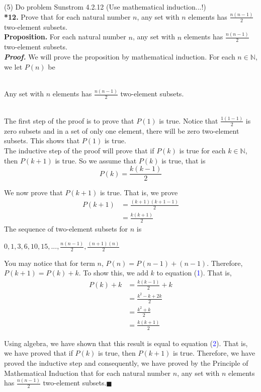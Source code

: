 \documentclass{article}
\begin{document}
(5) Do problem Sunstrom 4.2.12 (Use mathematical induction...!)\\

\textbf{*12.} Prove that for each natural number $n$, any set with $n$ elements has $\frac{n(n - 1)}{2}$ two-element subsets.\\

\textbf{Proposition.} For each natural number $n$, any set with $n$ elements has $\frac{n(n - 1)}{2}$ two-element subsets.\\
\textit{\textbf{Proof.}} We will prove the proposition by mathematical induction. For each $n \in \mathbb{N}$, we let $P(n)$ be \\ \\
\centerline{Any set with $n$ elements has $\frac{n(n - 1)}{2}$ two-element subsets.}\\

The first step of the proof is to prove that $P(1)$ is true. Notice that $\frac{1(1 - 1)}{2}$ is zero subsets and in a set of only one element, there will be zero two-element subsets. This shows that $P(1)$ is true.\\

The inductive step of the proof will prove that if $P(k)$ is true for each $k \in \mathbb{N}$, then $P(k + 1)$ is true. So we assume that $P(k)$ is true, that is \begin{equation}
P(k) = \frac{k(k - 1)}{2}
\end{equation}

We now prove that $P(k + 1)$ is true. That is, we prove
\begin{align}
P(k + 1) &= \frac{(k + 1)(k + 1 - 1)}{2}\nonumber \\
&= \frac{k(k + 1)}{2} 
\end{align}
The sequence of two-element subsets for $n$ is\\
\centerline{$0, 1, 3, 6, 10, 15, ... , \frac{n(n - 1)}{2}, \frac{(n + 1)(n)}{2}$}

You may notice that for term $n$, $P(n) = P(n - 1) + (n - 1)$. Therefore, $P(k + 1) = P(k) + k$. To show this, we add $k$ to equation (\textcolor{blue}{1}). That is,
\begin{align*}
P(k) + k &= \frac{k(k - 1)}{2} + k\\
&= \frac{k^2 - k + 2k}{2}\\
&= \frac{k^2 + k}{2}\\
&= \frac{k(k + 1)}{2}
\end{align*}

Using algebra, we have shown that this result is equal to equation (\textcolor{blue}{2}). That is, we have proved that if $P(k)$ is true, then $P(k + 1)$ is true. Therefore, we have proved the inductive step and consequently, we have proved by the Principle of Mathematical Induction that for each natural number $n$, any set with $n$ elements has $\frac{n(n - 1)}{2}$ two-element subsets.\hfill$\blacksquare$
\end{document}
